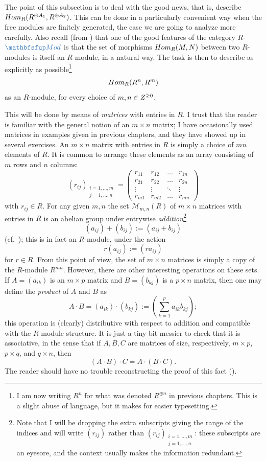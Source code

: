 The point of this subsection is to deal with the good news, that is,
describe $Hom_R(R^{\oplus A_1}, R^{\oplus A_2})$. This can be done in
a particularly convenient way when the free modules are finitely
generated, the case we are going to analyze more carefully.  Also
recall (from ) that one of
the good features of the category $R$-$\categ{Mod}$ is that the set of
morphisms $Hom_R(M,N)$ between two $R$-modules is itself an
$R$-module, in a natural way. The task is then to describe as
explicitly as possible\footnote{I am now writing $R^n$ for what was
  denoted $R^{\oplus n}$ in previous chapters.  This is a slight abuse
  of language, but it makes for easier typesetting.}
\[
  Hom_R(R^n, R^m)
\]
as an $R$-module, for every choice of $m, n \in Z^{\geq 0}$.

This will be done by means of \emph{matrices} with entries in $R$. I
trust that the reader is familiar with the general notion of an
$m \times n$ matrix; I have occasionally used matrices in examples
given in previous chapters, and they have showed up in several
exercises. An $m \times n$ matrix with entries in $R$ is simply a
choice of $mn$ elements of $R$. It is common to arrange these elements
as an array consisting of $m$ rows and $n$ columns:
\[
  (r_{ij})_{\substack{i=1,\dots,m \\ j=1,\dots,n}} =
  \begin{pmatrix}
    r_{11} & r_{12} & \dots & r_{1n} \\
    r_{21} & r_{22} & \dots & r_{2n} \\
    \vdots & \vdots & \ddots & \vdots \\
    r_{m1} & r_{m2} & \dots & r_{mn}
  \end{pmatrix}
\]
with $r_{ij} \in R$. For any given $m, n$ the set
$\mathcal{M}_{m,n}(R)$ of $m \times n$ matrices with entries in $R$ is
an abelian group under entrywise \emph{addition}\footnote{Note that I
  will be dropping the extra subscripts giving the range of the
  indices and will write $(r_{ij})$ rather than
  $(r_{ij})_{\substack{i=1,\dots,m \\ j=1,\dots,n}}$: these subscripts
  are an eyesore, and the context usually makes the information
  redundant.}
\[
  (a_{ij}) + (b_{ij}) := (a_{ij} + b_{ij})
\]
(cf.\ ); this is in fact an $R$-module,
under the action
\[
  r(a_{ij}) := (r a_{ij})
\]
for $r \in R$. From this point of view, the set of $m \times n$
matrices is simply a copy of the $R$-module $R^{mn}$.  However, there
are other interesting operations on these sets. If $A = (a_{ik})$ is
an $m \times p$ matrix and $B = (b_{kj})$ is a $p \times n$ matrix,
then one may define the \emph{product} of $A$ and $B$ as
\[
  A \cdot B = (a_{ik}) \cdot (b_{kj}) := \left( \sum_{k=1}^p a_{ik}
    b_{kj} \right);
\]
this operation is (clearly) distributive with respect to addition and
compatible with the $R$-module structure. It is just a tiny bit
messier to check that it is associative, in the sense that if
$A, B, C$ are matrices of size, respectively, $m \times p$,
$p \times q$, and $q \times n$, then
\[
  (A \cdot B) \cdot C = A \cdot (B \cdot C).
\]
The reader should have no trouble reconstructing the proof of this
fact ().

